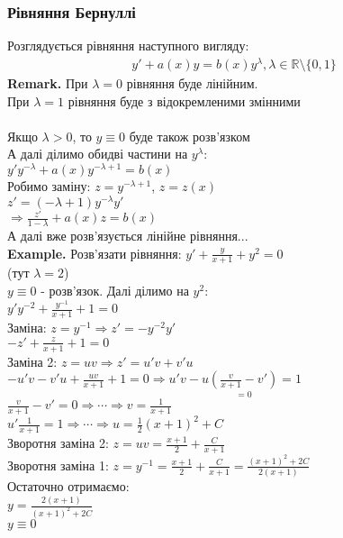 \documentclass[a4paper, 14pt]{extarticle}
\def\huge{\displaystyle}
\def\bigline{\vspace{5mm}\\}
\begin{document}
	\subsubsection{Рівняння Бернуллі}
	Розглядується рівняння наступного вигляду:
	\begin{align*}
	y' + a(x)y = b(x)y^{\lambda}, \lambda \in \mathbb{R} \setminus \{0,1\}
	\end{align*}
	\textbf{Remark.} При $\lambda = 0$ рівняння буде лінійним.\\
	При $\lambda = 1$ рівняння буде з відокремленими змінними\\
	\\
	Якщо $\lambda > 0$, то $y \equiv 0$ буде також розв'язком\\
	А далі ділимо обидві частини на $y^{\lambda}$:\\
	$\huge y'y^{-\lambda} + a(x)y^{-\lambda+1} = b(x)$\\
	Робимо заміну: $z = y^{-\lambda+1}$, $z=z(x)$\\
	$z' = (-\lambda + 1)y^{-\lambda}y'$\\
	$\Rightarrow \huge \frac{z'}{1-\lambda} + a(x)z=b(x)$\\
	А далі вже розв'язується лінійне рівняння...
	\bigline
	\textbf{Example.} Розв'язати рівняння: $\huge y' + \frac{y}{x+1} + y^2 = 0$\\
	(тут $\lambda = 2$)\\
	$y \equiv 0$ - розв'язок. Далі ділимо на $y^2$:\\
	$\huge y'y^{-2} + \frac{y^{-1}}{x+1} + 1 = 0$\\
	Заміна: $z = y^{-1} \Rightarrow z' = -y^{-2}y'$\\
	$\huge -z' + \frac{z}{x+1} + 1 = 0$\\
	Заміна 2: $z = uv \Rightarrow z' = u'v+v'u$\\
	$\huge -u'v - v'u + \frac{uv}{x+1} + 1 = 0 \Rightarrow u'v - u\underset{=0}{(\frac{v}{x+1}-v')} = 1$\\
	$\huge \frac{v}{x+1} - v' = 0 \Rightarrow \cdots \Rightarrow v = \frac{1}{x+1}$\\
	$\huge u'\frac{1}{x+1} = 1 \Rightarrow \cdots \Rightarrow u = \frac{1}{2}(x+1)^2 + C$\\
	Зворотня заміна 2: $\huge z = uv = \frac{x+1}{2} + \frac{C}{x+1}$\\
	Зворотня заміна 1: $\huge z = y^{-1} = \frac{x+1}{2} + \frac{C}{x+1} = \frac{(x+1)^2+2C}{2(x+1)}$\\
	Остаточно отримаємо:\\
	$\huge y = \frac{2(x+1)}{(x+1)^2 + 2C}$\\
	$y \equiv 0$\\
	
\end{document}
